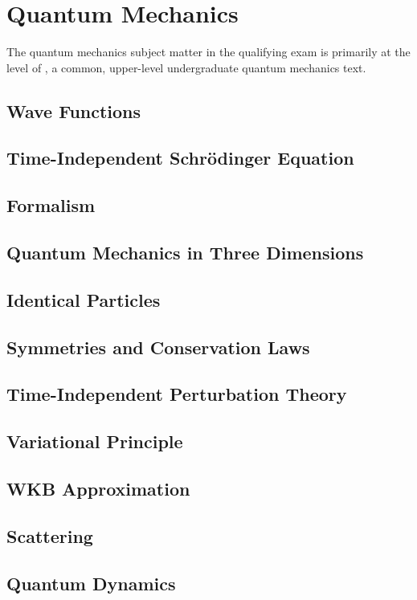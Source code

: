 \newpage
\chapter{Quantum Mechanics}
\label{sec:qmech}
The quantum mechanics subject matter in the qualifying exam is primarily at the level of \cite{griffithsIntroductionQuantumMechanics2018}, a common, upper-level undergraduate quantum mechanics text.

\section{Wave Functions}
\section{Time-Independent Schr\"odinger Equation}
\section{Formalism}
\section{Quantum Mechanics in Three Dimensions}
\section{Identical Particles}
\section{Symmetries and Conservation Laws}
\section{Time-Independent Perturbation Theory}
\section{Variational Principle}
\section{WKB Approximation}
\section{Scattering}
\section{Quantum Dynamics}

